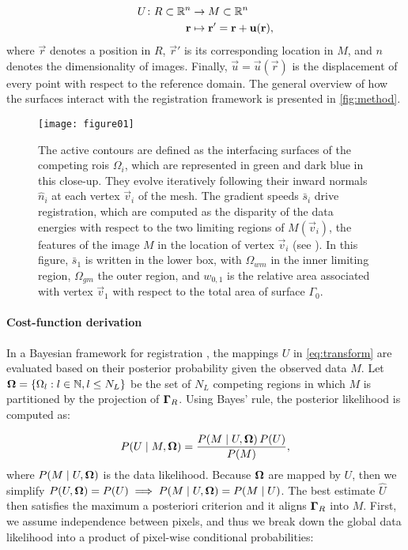   \begin{align}
  U\colon R \subset \mathbb{R}^n &\to M \subset \mathbb{R}^n \notag\\
  \vec{r} &\mapsto \vec{r}' =\vec{r}+\vec{u}(\vec{r}),
  \label{eq:transform}
  \end{align}
  where $\vec{r}$ denotes a position in $R$, $\vec{r}'$ is
  its corresponding location in $M$, and $n$ denotes the dimensionality of images.
Finally, $\vec{u} = \vec{u}(\vec{r})$ is the displacement of every point with respect
  to the reference domain.
The general overview of how the surfaces interact with the registration framework
  is presented in \autoref{fig:method}.

\begin{figure}
  \texttt{[image: figure01]}
  \caption{The active contours are defined as the interfacing surfaces of the competing
    \glspl{roi} $\Omega_i$, which
  are represented in green and dark blue in this close-up.
  They evolve iteratively following their inward normals $\hat{n}_i$ at each vertex
    $\vec{v}_i$ of the mesh.
  The gradient speeds $\bar{s}_i$ drive registration, which are computed as the disparity of the data
    energies with respect to the two limiting regions of $M(\vec{v}_i)$, the features of the image
    $M$ in the location of vertex $\vec{v}_i$ (see ).
  In this figure, $\bar{s}_1$ is written in the lower
    box, with $\Omega_{wm}$ in the inner limiting region, $\Omega_{gm}$ the outer region, and
    $w_{0,1}$ is the relative area associated with vertex $\vec{v}_1$ with respect to
    the total area of surface $\Gamma_0$.
      }\label{fig:method}
\end{figure}

\paragraph*{Cost-function derivation}
In a Bayesian framework for registration \citep{wyatt_map_2003,pohl_bayesian_2006,gass_simultaneous_2014},
  the mappings $U$ in \eqref{eq:transform} are
  evaluated based on their posterior probability given the observed data
  $M$.
Let $\boldsymbol{\Omega} = \{\Omega_l: l \in \mathbb{N}, l \leq N_L\}$ be the set of $N_L$ competing regions in
  which $M$ is partitioned by the projection of $\boldsymbol{\Gamma}_R$.
Using Bayes' rule, the posterior likelihood is computed as:

  \begin{equation}
  P(U \mid M, \omegaset ) = \frac{P(M \mid U,\omegaset )\, P(U)}{P(M)},
  \label{eq:bayes_rule}
  \end{equation}
  where $P(M \mid U,\boldsymbol{\Omega})$ is the data likelihood.
Because $\boldsymbol{\Omega}$ are mapped by $U$, then we simplify
  $P(U, \boldsymbol{\Omega}) = P(U) \implies P(M \mid U,\boldsymbol{\Omega}) = P(M \mid U)$.
The best estimate $\hat{U}$ then satisfies the maximum a posteriori criterion
  \citep{bishop_pattern_2006} and it aligns $\boldsymbol{\Gamma}_R$ into $M$.
First, we assume independence between pixels, and thus we break down the
  global data likelihood into a product of pixel-wise conditional probabilities:

